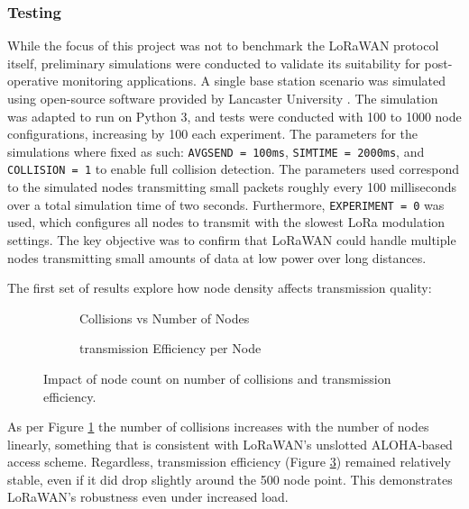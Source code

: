 \subsubsection{Testing}
While the focus of this project was not to benchmark the LoRaWAN protocol itself, preliminary simulations were conducted to validate its suitability for post-operative monitoring applications. A single base station scenario was simulated using open-source software provided by Lancaster University \cite{lancaster_uk_simulation_software}. The simulation was adapted to run on Python 3, and tests were conducted with 100 to 1000 node configurations, increasing by 100 each experiment. The parameters for the simulations where fixed as such: \texttt{AVGSEND = 100ms}, \texttt{SIMTIME = 2000ms}, and \texttt{COLLISION = 1} to enable full collision detection. The parameters used correspond to the simulated nodes transmitting small packets roughly every 100 milliseconds over a total simulation time of two seconds. Furthermore, \texttt{EXPERIMENT = 0} was used, which configures all nodes to transmit with the slowest LoRa modulation settings. The key objective was to confirm that LoRaWAN could handle multiple nodes transmitting small amounts of data at low power over long distances.

\vspace{1em} \noindent The first set of results explore how node density affects transmission quality:
\begin{figure}[H]
\centering
\begin{subfigure}{0.48\textwidth}
	\centering
	
	\caption{Collisions vs Number of Nodes}
	\label{fig:collisions_vs_nodes}
\end{subfigure}
\hfill
\begin{subfigure}{0.48\textwidth}
	\centering
	
	\caption{transmission Efficiency per Node}
	\label{fig:efficiency_vs_nodes}
\end{subfigure}
\caption{Impact of node count on number of collisions and transmission efficiency.}
\end{figure}

As per Figure \ref{fig:collisions_vs_nodes} the number of collisions increases with the number of nodes linearly, something that is consistent with LoRaWAN's unslotted ALOHA-based access scheme. Regardless, transmission efficiency (Figure \ref{fig:efficiency_vs_nodes}) remained relatively stable, even if it did drop slightly around the 500 node point. This demonstrates LoRaWAN's robustness even under increased load.

